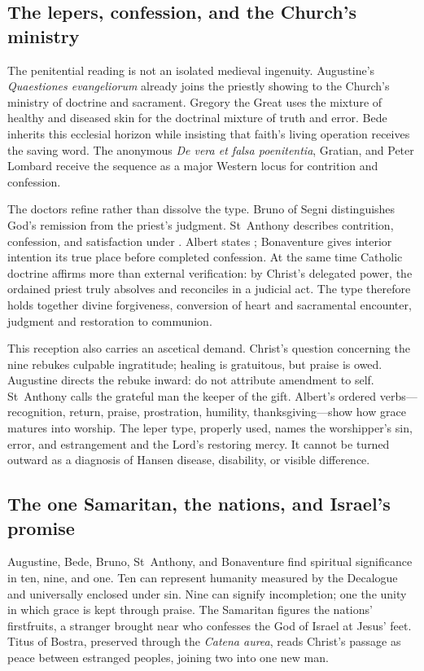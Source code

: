 \subsection*{The lepers, confession, and the Church's ministry}

The penitential reading is not an isolated medieval ingenuity. Augustine's
\emph{Quaestiones evangeliorum} already joins the priestly showing to the
Church's ministry of doctrine and sacrament. Gregory the Great uses the
mixture of healthy and diseased skin for the doctrinal mixture of truth and
error. Bede inherits this ecclesial horizon while insisting that faith's
living operation receives the saving word. The anonymous \emph{De vera et
falsa poenitentia}, Gratian, and Peter Lombard receive the sequence as a
major Western locus for contrition and confession.

The doctors refine rather than dissolve the type. Bruno of Segni distinguishes
God's remission from the priest's judgment. St~Anthony describes contrition,
confession, and satisfaction under .
Albert states ; Bonaventure gives
interior intention its true place before completed confession. At the same
time Catholic doctrine affirms more than external verification: by Christ's
delegated power, the ordained priest truly absolves and reconciles in a
judicial act. The type therefore holds together divine forgiveness, conversion
of heart and sacramental encounter, judgment and restoration to communion.

This reception also carries an ascetical demand. Christ's question concerning
the nine rebukes culpable ingratitude; healing is gratuitous, but praise is
owed. Augustine directs the rebuke inward: do not attribute amendment to self.
St~Anthony calls the grateful man the keeper of the gift. Albert's ordered
verbs---recognition, return, praise, prostration, humility, thanksgiving---show
how grace matures into worship. The leper type, properly used, names the
worshipper's sin, error, and estrangement and the Lord's restoring mercy. It
cannot be turned outward as a diagnosis of Hansen disease, disability, or
visible difference.

\subsection*{The one Samaritan, the nations, and Israel's promise}

Augustine, Bede, Bruno, St~Anthony, and Bonaventure find spiritual significance
in ten, nine, and one. Ten can represent humanity
measured by the Decalogue and universally enclosed under sin. Nine can signify
incompletion; one the unity in which grace is kept through praise. The
Samaritan figures the nations' firstfruits, a stranger brought near who
confesses the God of Israel at Jesus' feet. Titus of Bostra, preserved through
the \emph{Catena aurea}, reads Christ's passage as peace between estranged
peoples, joining two into one new man.

